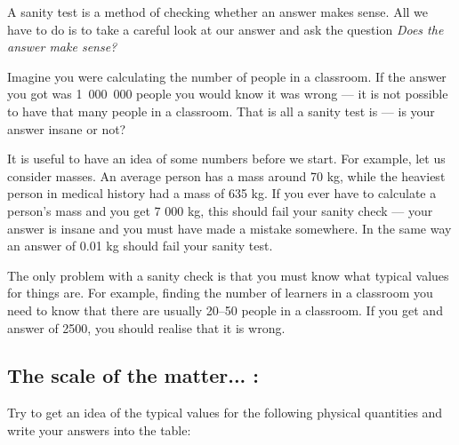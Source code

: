       \label{m30853*id67594}A sanity test is a method of checking whether an answer makes sense. All we have to do is to take a careful look at our answer and ask the question \textsl{Does the answer make sense?}\par 
      \label{m30853*id67603}Imagine you were calculating the number of people in a classroom. If the answer you got was 1~000~000 people you would know it was wrong --- it is not possible to have that many people in a classroom. That is all a sanity test is --- is your answer insane or not?\par 
      \label{m30853*id67610}It is useful to have an idea of some numbers before we start. For example, let us consider masses. An average person has a mass around 70 kg, while the heaviest person in medical history had a mass of 635 kg. If you ever have to calculate a person's mass and you get 7 000 kg, this should fail your sanity check --- your answer is insane and you must have made a mistake somewhere. In the same way an answer of 0.01 kg should fail your sanity test.\par 
      \label{m30853*id67621}The only problem with a sanity check is that you must know what typical values for things are. For example, finding the number of learners in a classroom you need to know that there are usually 20--50 people in a classroom. If you get and answer of 2500, you should realise that it is wrong.\par 
\label{m30853*secfhsst!!!underscore!!!id1148}
            \subsection{ The scale of the matter... :}
            \nopagebreak
             \label{m30853*uid09832} Try to get an idea of the typical values for the following physical quantities and write your answers into the table:\par 
      
    
      

